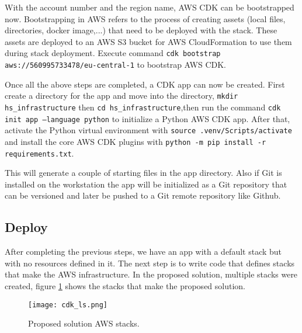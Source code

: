 With the account number and the region name, AWS CDK can be bootstrapped now. Bootstrapping in AWS refers to the process of creating assets (local files, directories, docker image,...) that need to be deployed with the stack. These assets are deployed to an AWS S3 bucket for AWS CloudFormation to use them during stack deployment. Execute command \texttt{cdk bootstrap aws://560995733478/eu-central-1} to bootstrap AWS CDK.

Once all the above steps are completed, a CDK app can now be created. First create a directory for the app and move into the directory, \texttt{mkdir hs_infrastructure} then \texttt{cd hs_infrastructure},then run the command \texttt{cdk init app --language python} to initialize a Python AWS CDK app. After that, activate the Python virtual environment with \texttt{source .venv/Scripts/activate} and install the core AWS CDK plugins with \texttt{python -m pip install -r requirements.txt}.

This will generate a couple of starting files in the app directory. Also if Git is installed on the workstation the app will be initialized as a Git repository that can be versioned and later be pushed to a Git remote repository like Github.




\subsection*{Deploy}
\label{subsec:deploy}

After completing the previous steps, we have an app with a default stack but with no resources defined in it. The next step is to write code that defines stacks that make the AWS infrastructure. In the proposed solution, multiple stacks were created, figure \ref{fig:aws-stacks} shows the stacks that make the proposed solution.

\begin{figure}[H]
    \centering \texttt{[image: cdk\_ls.png]}
    \caption{Proposed solution AWS stacks.}
    \label{fig:aws-stacks}
\end{figure}

